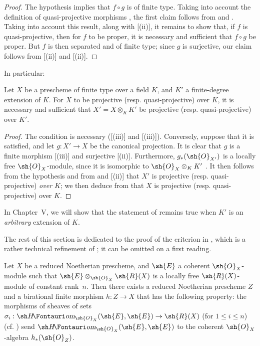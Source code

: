\begin{proof}
The hypothesis implies that $f\circ g$ is of finite type.
Taking into account the definition of quasi-projective morphisms , the first claim follows from  and .
Taking into account this result, along with [(ii)], it remains to show that, if $f$ is quasi-projective, then for $f$ to be proper, it is necessary and sufficient that $f\circ g$ be proper.
But $f$ is then separated  and of finite type;
since $g$ is surjective, our claim follows from [(ii)] and [(ii)].
\end{proof}

In particular:

\begin{corollary}[6.6.5]
\label{II.6.6.5}
Let $X$ be a prescheme of finite type over a field $K$, and $K'$ a finite-degree extension of $K$.
For $X$ to be projective (resp. quasi-projective) over $K$, it is necessary and sufficient that $X'=X\otimes_K K'$ be projective (resp. quasi-projective) over $K'$.
\end{corollary}

\begin{proof}
The condition is necessary ([(iii)] and [(iii)]).
Conversely, suppose that it is satisfied, and let $g:X'\to X$ be the canonical projection.
It is clear that $g$ is a finite morphism [(iii)] and surjective [(ii)].
Furthermore, $g_*(\sh{O}_{X'})$ is a locally free $\sh{O}_X$-module, since it is isomorphic to $\sh{O}_X\otimes_K K'$ .
It then follows from the hypothesis and from  and [(ii)] that $X'$ is projective (resp. quasi-projective) \emph{over $K$};
we then deduce from  that $X$ is projective (resp. quasi-projective) over $K$.
\end{proof}

In Chapter~V, we will show that the statement of  remains true when $K'$ is an \emph{arbitrary} extension of $K$.

The rest of this section is dedicated to the proof of the criterion in , which is a rather technical refinement of ;
it can be omitted on a first reading.

\begin{lemma}[6.6.6]
\label{II.6.6.6}
Let $X$ be a reduced Noetherian prescheme, and $\sh{E}$ a coherent $\sh{O}_X$-module such that $\sh{E}\otimes_{\sh{O}_X}\sh{R}(X)$ is a locally free $\sh{R}(X)$-module of constant rank~$n$.
Then there exists a reduced Noetherian prescheme $Z$ and a birational finite morphism $h:Z\to X$ that has the following property: the morphisms of sheaves of sets $\sigma_i:\shHom_{\sh{O}_X}(\sh{E},\sh{E})\to\sh{R}(X)$ (for $1\leq i\leq n$) (cf. ) send $\shHom_{\sh{O}_X}(\sh{E},\sh{E})$ to the coherent $\sh{O}_X$-algebra $h_*(\sh{O}_Z)$.
\end{lemma}

